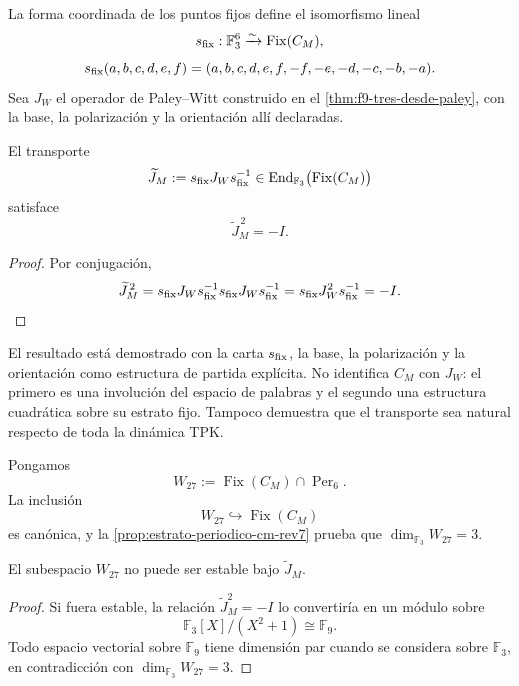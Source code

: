 La forma coordinada de los puntos fijos define el isomorfismo lineal
\[
 s_{\rm fix}:\mathbb F_3^6\xrightarrow{\sim}\operatorname{Fix}(C_M),
\]
\[
 s_{\rm fix}(a,b,c,d,e,f)
 =(a,b,c,d,e,f,-f,-e,-d,-c,-b,-a).
\]
Sea \(J_W\) el operador de Paley--Witt construido en el
\cref{thm:f9-tres-desde-paley}, con la base, la polarización y la orientación
allí declaradas.

\begin{proposition}[Estructura compleja \(\widetilde J_M^{\,2}=-I\) sobre el estrato fijo]
\label{prop:raiz-menos-uno-estrato-fijo-cm}
El transporte
\[
\widetilde J_M:=s_{\rm fix}J_Ws_{\rm fix}^{-1}
\in\operatorname{End}_{\mathbb F_3}
   \bigl(\operatorname{Fix}(C_M)\bigr)
\]
satisface
\[
 \widetilde J_M^{\,2}=-I.
\]
\end{proposition}

\begin{proof}
Por conjugación,
\[
 \widetilde J_M^{\,2}
 =s_{\rm fix}J_Ws_{\rm fix}^{-1}
  s_{\rm fix}J_Ws_{\rm fix}^{-1}
 =s_{\rm fix}J_W^2s_{\rm fix}^{-1}
 =-I.
\]
\end{proof}

El resultado está demostrado con la carta \(s_{\rm fix}\), la base, la polarización y
la orientación como estructura de partida explícita. No identifica
\(C_M\) con \(J_W\): el primero es una involución del espacio de palabras y
el segundo una estructura cuadrática sobre su estrato fijo. Tampoco demuestra
que el transporte sea natural respecto de toda la dinámica TPK.

Pongamos
\[
 W_{27}
 :=\operatorname{Fix}(C_M)\cap\operatorname{Per}_6.
\]
La inclusión
\[
 W_{27}\hookrightarrow\operatorname{Fix}(C_M)
\]
es canónica, y la \cref{prop:estrato-periodico-cm-rev7} prueba que
\(\dim_{\mathbb F_3}W_{27}=3\).

\begin{corollary}
\label{cor:obstruccion-cuadratica-w27}
El subespacio \(W_{27}\) no puede ser estable bajo
\(\widetilde J_M\).
\end{corollary}

\begin{proof}
Si fuera estable, la relación
\(\widetilde J_M^2=-I\) lo convertiría en un módulo sobre
\[
 \mathbb F_3[X]/(X^2+1)\cong\mathbb F_9.
\]
Todo espacio vectorial sobre \(\mathbb F_9\) tiene dimensión par cuando se
considera sobre \(\mathbb F_3\), en contradicción con
\(\dim_{\mathbb F_3}W_{27}=3\).
\end{proof}

